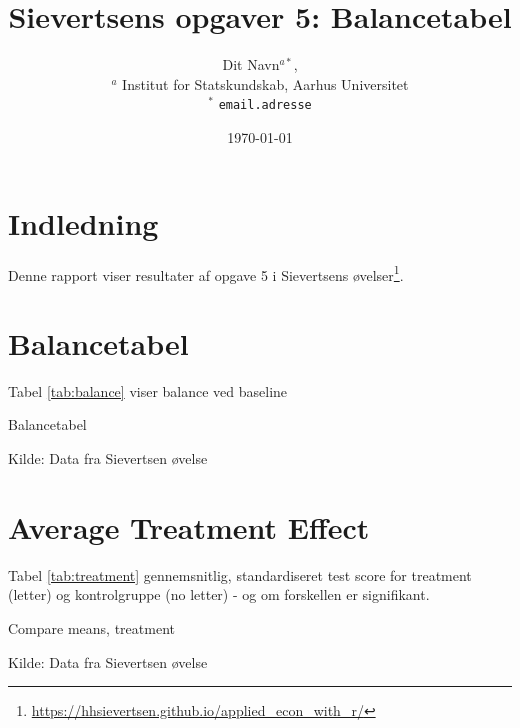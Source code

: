 \documentclass[12pt]{article}
\title{Sievertsens opgaver 5: Balancetabel }
\author{Dit Navn$^{a*}$,  \\
        \small $^{a}$ Institut for Statskundskab, Aarhus Universitet \\
        \small $^{*}$ \tt{email.adresse}}
\date{\today} %
\begin{document}
\doublespacing

\maketitle




\section*{Indledning}
Denne rapport viser resultater af opgave 5 i Sievertsens øvelser\footnote{\url{https://hhsievertsen.github.io/applied_econ_with_r/}}. 


\clearpage

\section*{Balancetabel}


Tabel \ref{tab:balance} viser balance ved baseline


\begin{table}[h] \centering
	\begin{threeparttable} 
		\caption{Balancetabel} \label{tab:balance}
			
		\begin{tablenotes}
            \item Kilde: Data fra Sievertsen øvelse
        \end{tablenotes}
	\end{threeparttable}
\end{table}


\section*{Average Treatment Effect}

Tabel \ref{tab:treatment} gennemsnitlig, standardiseret test score for treatment (letter) og kontrolgruppe (no letter) - og om forskellen er signifikant.


\begin{table}[h] \centering
	\begin{threeparttable} 
		\caption{Compare means, treatment} \label{tab:treatment}
			
		\begin{tablenotes}
            \item Kilde: Data fra Sievertsen øvelse
        \end{tablenotes}
	\end{threeparttable}
\end{table}


\end{document}
